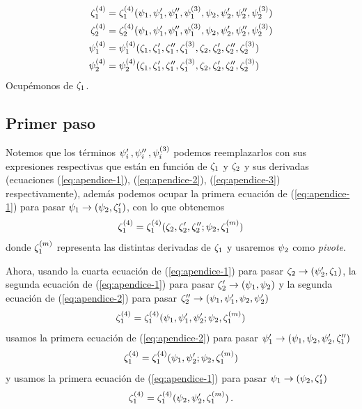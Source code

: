\documentclass[%
 aip,
 jmp,%
 amsmath,amssymb,
 reprint,%
]{revtex4-2}
\begin{document}
{\begin{equation}\label{eq:apendice-4}
    \begin{aligned}
        \zeta_1^{(4)}&=\zeta_1^{(4)}(\psi_1,\psi_1',\psi_1'',\psi_1^{(3)},\psi_2,\psi_2',\psi_2'',\psi_2^{(3)})\\
        \zeta_2^{(4)}&=\zeta_2^{(4)}(\psi_1,\psi_1',\psi_1'',\psi_1^{(3)},\psi_2,\psi_2',\psi_2'',\psi_2^{(3)})\\
        \psi_1^{(4)}&=\psi_1^{(4)}(\zeta_1,\zeta_1',\zeta_1'',\zeta_1^{(3)},\zeta_2,\zeta_2',\zeta_2'',\zeta_2^{(3)})\\
        \psi_2^{(4)}&=\psi_2^{(4)}(\zeta_1,\zeta_1',\zeta_1'',\zeta_1^{(3)},\zeta_2,\zeta_2',\zeta_2'',\zeta_2^{(3)})
    \end{aligned}
\end{equation}
Ocupémonos de $\zeta_1$. 

\subsection{Primer paso}
Notemos que los términos $\psi_i'\,,\psi_i''\,,\psi_i^{(3)}$ podemos reemplazarlos con sus expresiones respectivas que están en función de $\zeta_1$ y $\zeta_2$ y sus derivadas (ecuaciones (\ref{eq:apendice-1}), (\ref{eq:apendice-2}), (\ref{eq:apendice-3}) respectivamente), además podemos ocupar la primera ecuación de (\ref{eq:apendice-1}) para pasar $\psi_1\rightarrow (\psi_2,\zeta_1')$, con lo que obtenemos
\begin{equation}
     \zeta_1^{(4)}=\zeta_1^{(4)}(\zeta_2,\zeta_2',\zeta_2'';\psi_2,\zeta_1^{(m)})
\end{equation}
donde $\zeta_1^{(m)}$ representa las distintas derivadas de $\zeta_1$ y usaremos $\psi_2$ como \textit{pivote}.

Ahora, usando la cuarta ecuación de (\ref{eq:apendice-1}) para pasar $\zeta_2\rightarrow (\psi_2',\zeta_1)$, la segunda ecuación de (\ref{eq:apendice-1}) para pasar $\zeta_2'\rightarrow (\psi_1,\psi_2)$ y la segunda ecuación de (\ref{eq:apendice-2}) para pasar $\zeta_2''\rightarrow (\psi_1,\psi_1',\psi_2,\psi_2')$
\begin{equation}
    \zeta_1^{(4)}=\zeta_1^{(4)}(\psi_1,\psi_1',\psi_2';\psi_2,\zeta_1^{(m)})
\end{equation}
usamos la primera ecuación de (\ref{eq:apendice-2}) para pasar $\psi_1'\rightarrow (\psi_1,\psi_2,\psi_2',\zeta_1'')$
\begin{equation}
    \zeta_1^{(4)}=\zeta_1^{(4)}(\psi_1,\psi_2';\psi_2,\zeta_1^{(m)})
\end{equation}
y usamos la primera ecuación de (\ref{eq:apendice-1}) para pasar $\psi_1\rightarrow (\psi_2,\zeta_1')$
\begin{equation}\label{eq:z_1^4}
    \zeta_1^{(4)}=\zeta_1^{(4)}(\psi_2,\psi_2',\zeta_1^{(m)})\,.
\end{equation}

}
\end{document}
